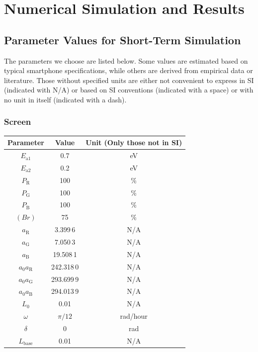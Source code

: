 \documentclass[12pt]{article}
\begin{document}
\section{Numerical Simulation and Results}

\subsection{Parameter Values for Short-Term Simulation}

The parameters we choose are listed below. Some values are estimated based on typical smartphone specifications, while others are derived from empirical data or literature. Those without specified units are either not convenient to express in SI (indicated with N/A) or based on SI conventions (indicated with a space) or with no unit in itself (indicated with a dash).

\subsubsection{Screen}

\begin{center}
\begin{tabular}{c|cc}
	\hline
	Parameter & Value & Unit (Only those not in SI) \\
	\hline
	$E_\mathrm{a1}$ & 0.7 & eV \\
	$E_\mathrm{a2}$ & 0.2 & eV \\
	\hline
	$P_\mathrm{R}$ & 100 & \% \\
	$P_\mathrm{G}$ & 100 & \% \\
	$P_\mathrm{B}$ & 100 & \% \\
	$(Br)$ & 75 & \% \\
	$a_\mathrm R$ & 3.399\,6 & N/A \\
	$a_\mathrm G$ & 7.050\,3 & N/A \\
	$a_\mathrm B$ & 19.508\,1 & N/A \\
	$a_0a_\mathrm R$ & 242.318\,0 & N/A \\
	$a_0a_\mathrm G$ & 293.699\,9 & N/A \\
	$a_0a_\mathrm B$ & 294.013\,9 & N/A \\
	$L_0$ & 0.01 & N/A \\
	$\omega$ & $\pi/12$ & rad/hour \\
	$\delta$ & 0 & rad \\
	$L_\mathrm{base}$ & 0.01 & N/A \\
	\hline
\end{tabular}
\end{center}
\end{document}
